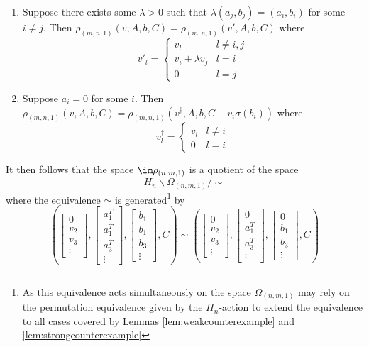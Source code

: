 \documentclass[11pt,letterpaper]{amsart}
\begin{document}
\begin{lemma}\label{lem:strongcounterexample}
    \begin{enumerate}
        \item Suppose there exists some $\lambda>0$ such that $\lambda (a_j, b_j) = (a_i, b_i)$ for some $i\neq j$. Then $\rho_{(m,n,1)}(v, A, b, C) = \rho_{(m, n, 1)}(v', A, b, C)$ where 
        $$
        v'_l = \begin{cases} v_l & l\neq i, j\\ v_i + \lambda v_j & l = i\\ 0 & l=j\end{cases}
        $$
        \item Suppose $a_i=0$ for some $i$. Then $\rho_{(m,n,1)}(v, A, b, C) = \rho_{(m, n, 1)}(v^\dagger, A, b, C+v_i\sigma(b_i))$ where 
        $$
        v^\dagger_l = \begin{cases} v_l & l\neq i\\ 0 & l = i\end{cases}
        $$
    \end{enumerate}
\end{lemma}
It then follows that the space $\im \rho_{(n, m,1)}$ is a quotient of the space
$$
    H_n \backslash \Omega_{(n, m, 1)}/\sim
$$
where the equivalence $\sim$ is generated\footnote{As this equivalence acts simultaneously on the space $\Omega_{(n, m, 1)}$ may rely on the permutation equivalence given by the $H_n$-action to extend the equivalence to all cases covered by Lemmas \ref{lem:weakcounterexample} and \ref{lem:strongcounterexample}} by 
$$
    \left(\begin{bmatrix}
        0 \\ v_2 \\ v_3\\ \vdots
    \end{bmatrix}, \begin{bmatrix}
        a_1^T \\ a_1^T \\ a_3^T\\ \vdots
    \end{bmatrix}, \begin{bmatrix}
        b_1 \\ b_1 \\ b_3\\ \vdots
    \end{bmatrix}, C\right) \sim \left(\begin{bmatrix}
        0 \\ v_2 \\ v_3 \\  \vdots
    \end{bmatrix}, \begin{bmatrix}
        0 \\ a_1^T \\ a_3^T\\ \vdots
    \end{bmatrix}, \begin{bmatrix}
        0 \\ b_1 \\ b_3\\ \vdots
    \end{bmatrix}, C\right) 
    $$
\end{document}
